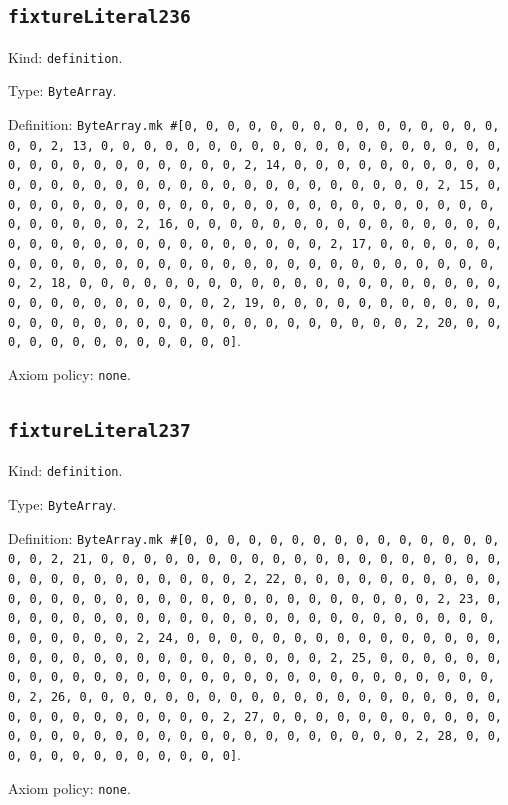 \documentclass[11pt]{article}
\begin{document}
\subsection*{\texttt{fixtureLiteral236}}
\noindent Kind: \texttt{definition}.\par
\noindent Type: \texttt{ByteArray}.\par
\noindent Definition: \texttt{ByteArray.mk \#[0, 0, 0, 0, 0, 0, 0, 0, 0, 0, 0, 0, 0, 0, 0, 0, 0, 2, 13, 0, 0, 0, 0, 0, 0, 0, 0, 0, 0, 0, 0, 0, 0, 0, 0, 0, 0, 0, 0, 0, 0, 0, 0, 0, 0, 0, 0, 0, 0, 2, 14, 0, 0, 0, 0, 0, 0, 0, 0, 0, 0, 0, 0, 0, 0, 0, 0, 0, 0, 0, 0, 0, 0, 0, 0, 0, 0, 0, 0, 0, 0, 2, 15, 0, 0, 0, 0, 0, 0, 0, 0, 0, 0, 0, 0, 0, 0, 0, 0, 0, 0, 0, 0, 0, 0, 0, 0, 0, 0, 0, 0, 0, 0, 2, 16, 0, 0, 0, 0, 0, 0, 0, 0, 0, 0, 0, 0, 0, 0, 0, 0, 0, 0, 0, 0, 0, 0, 0, 0, 0, 0, 0, 0, 0, 0, 2, 17, 0, 0, 0, 0, 0, 0, 0, 0, 0, 0, 0, 0, 0, 0, 0, 0, 0, 0, 0, 0, 0, 0, 0, 0, 0, 0, 0, 0, 0, 0, 2, 18, 0, 0, 0, 0, 0, 0, 0, 0, 0, 0, 0, 0, 0, 0, 0, 0, 0, 0, 0, 0, 0, 0, 0, 0, 0, 0, 0, 0, 0, 0, 2, 19, 0, 0, 0, 0, 0, 0, 0, 0, 0, 0, 0, 0, 0, 0, 0, 0, 0, 0, 0, 0, 0, 0, 0, 0, 0, 0, 0, 0, 0, 0, 2, 20, 0, 0, 0, 0, 0, 0, 0, 0, 0, 0, 0, 0, 0]}.\par
\noindent Axiom policy: \texttt{none}.\par
\subsection*{\texttt{fixtureLiteral237}}
\noindent Kind: \texttt{definition}.\par
\noindent Type: \texttt{ByteArray}.\par
\noindent Definition: \texttt{ByteArray.mk \#[0, 0, 0, 0, 0, 0, 0, 0, 0, 0, 0, 0, 0, 0, 0, 0, 0, 2, 21, 0, 0, 0, 0, 0, 0, 0, 0, 0, 0, 0, 0, 0, 0, 0, 0, 0, 0, 0, 0, 0, 0, 0, 0, 0, 0, 0, 0, 0, 0, 2, 22, 0, 0, 0, 0, 0, 0, 0, 0, 0, 0, 0, 0, 0, 0, 0, 0, 0, 0, 0, 0, 0, 0, 0, 0, 0, 0, 0, 0, 0, 0, 2, 23, 0, 0, 0, 0, 0, 0, 0, 0, 0, 0, 0, 0, 0, 0, 0, 0, 0, 0, 0, 0, 0, 0, 0, 0, 0, 0, 0, 0, 0, 0, 2, 24, 0, 0, 0, 0, 0, 0, 0, 0, 0, 0, 0, 0, 0, 0, 0, 0, 0, 0, 0, 0, 0, 0, 0, 0, 0, 0, 0, 0, 0, 0, 2, 25, 0, 0, 0, 0, 0, 0, 0, 0, 0, 0, 0, 0, 0, 0, 0, 0, 0, 0, 0, 0, 0, 0, 0, 0, 0, 0, 0, 0, 0, 0, 2, 26, 0, 0, 0, 0, 0, 0, 0, 0, 0, 0, 0, 0, 0, 0, 0, 0, 0, 0, 0, 0, 0, 0, 0, 0, 0, 0, 0, 0, 0, 0, 2, 27, 0, 0, 0, 0, 0, 0, 0, 0, 0, 0, 0, 0, 0, 0, 0, 0, 0, 0, 0, 0, 0, 0, 0, 0, 0, 0, 0, 0, 0, 0, 2, 28, 0, 0, 0, 0, 0, 0, 0, 0, 0, 0, 0, 0, 0]}.\par
\noindent Axiom policy: \texttt{none}.\par
\end{document}
